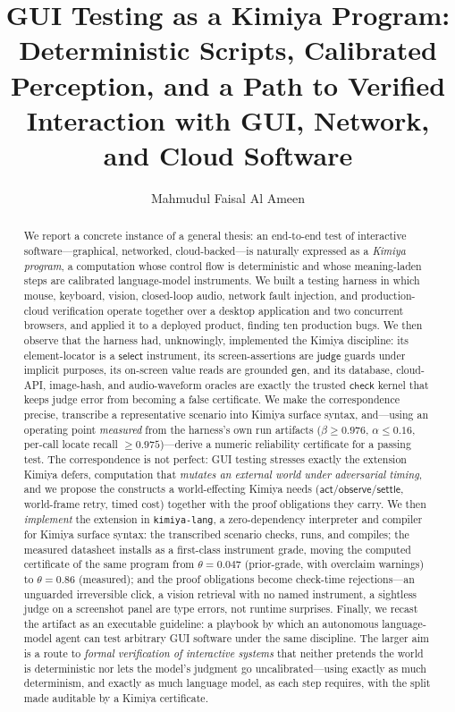 \documentclass[acmsmall,screen,nonacm]{acmart}
\newcommand{\gen}{\mathsf{gen}}
\newcommand{\checkk}{\mathsf{check}}
\newcommand{\judge}{\mathsf{judge}}
\newcommand{\select}{\mathsf{select}}
\newcommand{\actc}{\mathsf{act}}
\newcommand{\observe}{\mathsf{observe}}
\newcommand{\settle}{\mathsf{settle}}
\newcommand{\conf}{\theta}
\theoremstyle{acmdefinition}%
\theoremstyle{acmplain}%
\begin{document}
\title{GUI Testing as a Kimiya Program: Deterministic Scripts, Calibrated
Perception, and a Path to Verified Interaction with GUI, Network, and Cloud
Software}

\author{Mahmudul Faisal Al Ameen}

\begin{abstract}
We report a concrete instance of a general thesis: an end-to-end test of
interactive software---graphical, networked, cloud-backed---is naturally
expressed as a \emph{Kimiya program}, a computation whose control flow is
deterministic and whose meaning-laden steps are calibrated language-model
instruments. We built a testing harness in which mouse, keyboard, vision,
closed-loop audio, network fault injection, and production-cloud
verification operate together over a desktop application and two
concurrent browsers, and applied it to a deployed product, finding ten
production bugs. We then observe that the harness had, unknowingly,
implemented the Kimiya discipline: its element-locator is a $\select$
instrument, its screen-assertions are $\judge$ guards under implicit
purposes, its on-screen value reads are grounded $\gen$, and its
database, cloud-API, image-hash, and audio-waveform oracles are exactly
the trusted $\checkk$ kernel that keeps judge error from becoming a false
certificate. We make the correspondence precise, transcribe a
representative scenario into Kimiya surface syntax, and---using an
operating point \emph{measured} from the harness's own run
artifacts ($\beta \ge 0.976$, $\alpha \le 0.16$, per-call locate recall
$\ge 0.975$)---derive a numeric reliability certificate for a passing
test. The correspondence is not perfect: GUI testing stresses exactly the
extension Kimiya defers, computation that \emph{mutates an external
world under adversarial timing}, and we propose the constructs a
world-effecting Kimiya needs ($\actc$/$\observe$/$\settle$, world-frame
retry, timed cost) together with the proof obligations they carry. We
then \emph{implement} the extension in \texttt{kimiya-lang}, a
zero-dependency interpreter and compiler for Kimiya surface syntax: the
transcribed scenario checks, runs, and compiles; the measured datasheet
installs as a first-class instrument grade, moving the computed
certificate of the same program from $\conf=0.047$ (prior-grade, with
overclaim warnings) to $\conf=0.86$ (measured); and the proof
obligations become check-time rejections---an unguarded irreversible
click, a vision retrieval with no named instrument, a sightless judge on
a screenshot panel are type errors, not runtime surprises.
Finally, we recast the artifact as an executable guideline: a playbook by
which an autonomous language-model agent can test arbitrary GUI software
under the same discipline. The larger aim is a route to \emph{formal
verification of interactive systems} that neither pretends the world is
deterministic nor lets the model's judgment go uncalibrated---using
exactly as much determinism, and exactly as much language model, as each
step requires, with the split made auditable by a Kimiya certificate.
\end{abstract}
\end{document}

